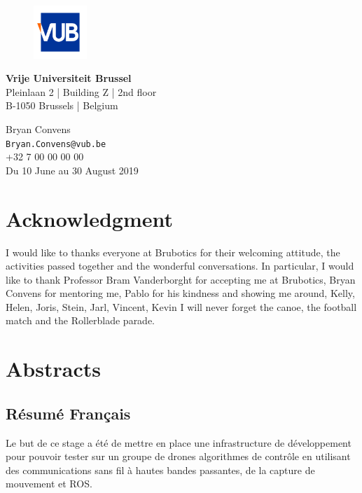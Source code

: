 \begin{titlepage}
 \vfill
 \begin{figure}[h!]
  \hspace{0.29cm}
  \includegraphics[width=2cm]{logos/vub_logo.jpg}
 \end{figure}
 \begin{minipage}{8cm}
  \textbf{Vrije Universiteit Brussel}\\
  Pleinlaan 2 | Building Z | 2nd floor\\
  B-1050 Brussels | Belgium
 \end{minipage} \hfill
 \begin{minipage}{7cm}
  \begin{flushright}
   Bryan Convens\\
   \texttt{Bryan.Convens@vub.be}\\
   +32 7 00 00 00 00\\ \vspace{0.2cm}
   Du 10 June au 30 August 2019
  \end{flushright}
 \end{minipage}

\end{titlepage}


\chapter*{Acknowledgment}
I would like to thanks everyone at Brubotics for their welcoming attitude,
the activities passed together and the wonderful conversations.
In particular, I would like to thank Professor Bram Vanderborght for accepting me at Brubotics,
Bryan Convens for mentoring me, Pablo for his kindness and showing me around,
Kelly, Helen, Joris, Stein, Jarl, Vincent, Kevin I will never forget the canoe, the football match and the Rollerblade parade.

\chapter*{Abstracts}
\section*{Résumé Français}
Le but de ce stage a été de mettre en place une infrastructure de développement pour pouvoir tester sur un groupe de drones algorithmes de contrôle en utilisant des communications sans fil à hautes bandes passantes, de la capture de mouvement et ROS.

